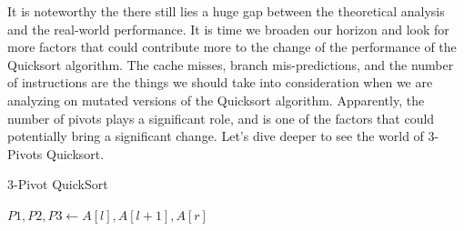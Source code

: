 \documentclass{article}
\begin{document}
It is noteworthy the there still lies a huge gap between the theoretical analysis and the real-world performance. It is time we broaden our horizon and look for more factors that could contribute more to the change of the performance of the Quicksort algorithm.
The cache misses, branch mis-predictions, and the number of instructions are the things we should take into consideration when we are analyzing on mutated versions of the Quicksort algorithm.
Apparently, the number of pivots plays a significant role, and is one of the factors that could potentially bring a significant change. Let's dive deeper to see the world of 3-Pivots Quicksort.

\begin{algorithm}[H]
    \caption{3-Pivot QuickSort}\label{3PivotQuickSort}
    \begin{algorithmic}[1]
        \State $P1, P2, P3 \gets A[l], A[l+1], A[r]$  


\end{algorithmic}
\end{algorithm}
\end{document}
